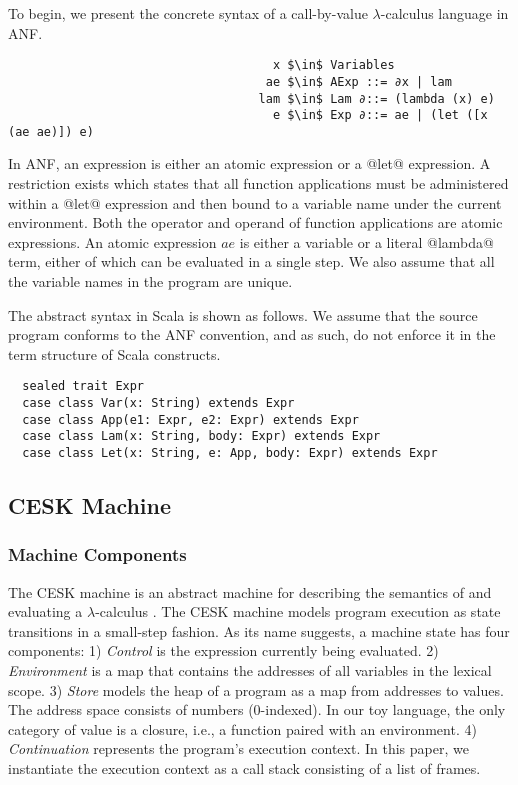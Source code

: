 \documentclass[acmsmall, screen]{acmart}\settopmatter{}
\begin{document}
To begin, we present the concrete syntax of a call-by-value $\lambda$-calculus language
in ANF.

\begin{lstlisting}
                                     x $\in$ Variables
                                    ae $\in$ AExp ::= ∂x | lam
                                   lam $\in$ Lam ∂::= (lambda (x) e)
                                     e $\in$ Exp ∂::= ae | (let ([x (ae ae)]) e)
\end{lstlisting}

In ANF, an expression is either an atomic expression or a @let@ expression.
A restriction exists which states that all function applications must be administered
within a @let@ expression and then bound to a variable name under the current environment.
Both the operator and operand of function applications are atomic expressions.
An atomic expression $ae$ is either a variable or a literal @lambda@ term, either of which
can be evaluated in a single step. We also assume that all the variable names in the program
 are unique.

The abstract syntax in Scala is shown as follows. We assume that the source program conforms
to the ANF convention, and as such, do not enforce it in the term structure of Scala constructs.

\begin{lstlisting}
  sealed trait Expr
  case class Var(x: String) extends Expr
  case class App(e1: Expr, e2: Expr) extends Expr
  case class Lam(x: String, body: Expr) extends Expr
  case class Let(x: String, e: App, body: Expr) extends Expr
\end{lstlisting}

\subsection{CESK Machine} \label{cesk}

\subsubsection{Machine Components}

The CESK machine is an abstract machine for describing the semantics of and evaluating
a $\lambda$-calculus \cite{felleisen1987calculus}. The CESK machine models program execution
as state transitions in a small-step fashion. As its name suggests, a machine state has
four components:
1) \textit{Control} is the expression currently being evaluated.
2) \textit{Environment} is a map that contains the addresses of all variables in the lexical scope.
3) \textit{Store} models the heap of a program as a map from addresses to values.
  The address space consists of numbers (0-indexed).
  In our toy language, the only category of value is a closure, i.e., a function paired with
  an environment.
4) \textit{Continuation} represents the program's execution context. In this paper, we instantiate the
execution context as a call stack consisting of a list of frames.
\end{document}
